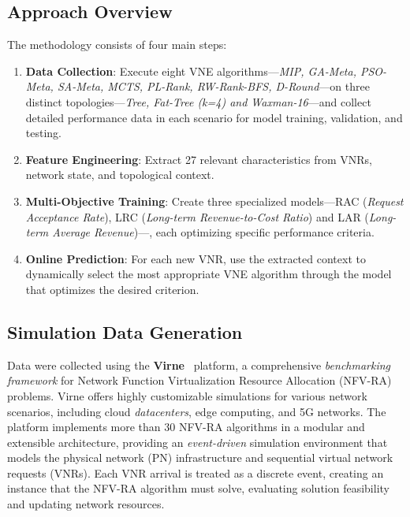\documentclass[runningheads]{llncs}
\begin{document}
\subsection{Approach Overview}

The methodology consists of four main steps:

\begin{enumerate}
    \item \textbf{Data Collection}: Execute eight VNE algorithms---\textit{MIP, GA-Meta, PSO-Meta, SA-Meta, MCTS, PL-Rank, RW-Rank-BFS, D-Round}---on three distinct topologies---\textit{Tree, Fat-Tree (k=4) and Waxman-16}---and collect detailed performance data in each scenario for model training, validation, and testing.
    \item \textbf{Feature Engineering}: Extract 27 relevant characteristics from VNRs, network state, and topological context.
    \item \textbf{Multi-Objective Training}: Create three specialized models---RAC (\textit{Request Acceptance Rate}), LRC (\textit{Long-term Revenue-to-Cost Ratio}) and LAR (\textit{Long-term Average Revenue})---, each optimizing specific performance criteria.
    \item \textbf{Online Prediction}: For each new VNR, use the extracted context to dynamically select the most appropriate VNE algorithm through the model that optimizes the desired criterion.
\end{enumerate}

\subsection{Simulation Data Generation}

Data were collected using the \textbf{Virne}~\cite{wang2024virne} platform, a comprehensive \textit{benchmarking} \textit{framework} for Network Function Virtualization Resource Allocation (NFV-RA) problems. Virne offers highly customizable simulations for various network scenarios, including cloud \textit{datacenters}, edge computing, and 5G networks. The platform implements more than 30 NFV-RA algorithms in a modular and extensible architecture, providing an \textit{event-driven} simulation environment that models the physical network (PN) infrastructure and sequential virtual network requests (VNRs). Each VNR arrival is treated as a discrete event, creating an instance that the NFV-RA algorithm must solve, evaluating solution feasibility and updating network resources.
\end{document}
